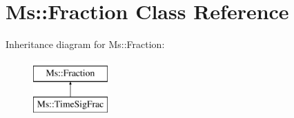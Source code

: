 \hypertarget{class_ms_1_1_fraction}{}\section{Ms\+:\+:Fraction Class Reference}
\label{class_ms_1_1_fraction}
Inheritance diagram for Ms\+:\+:Fraction\+:\begin{figure}[H]
\begin{center}
\leavevmode
\includegraphics[height=2.000000cm]{class_ms_1_1_fraction}
\end{center}
\end{figure}
